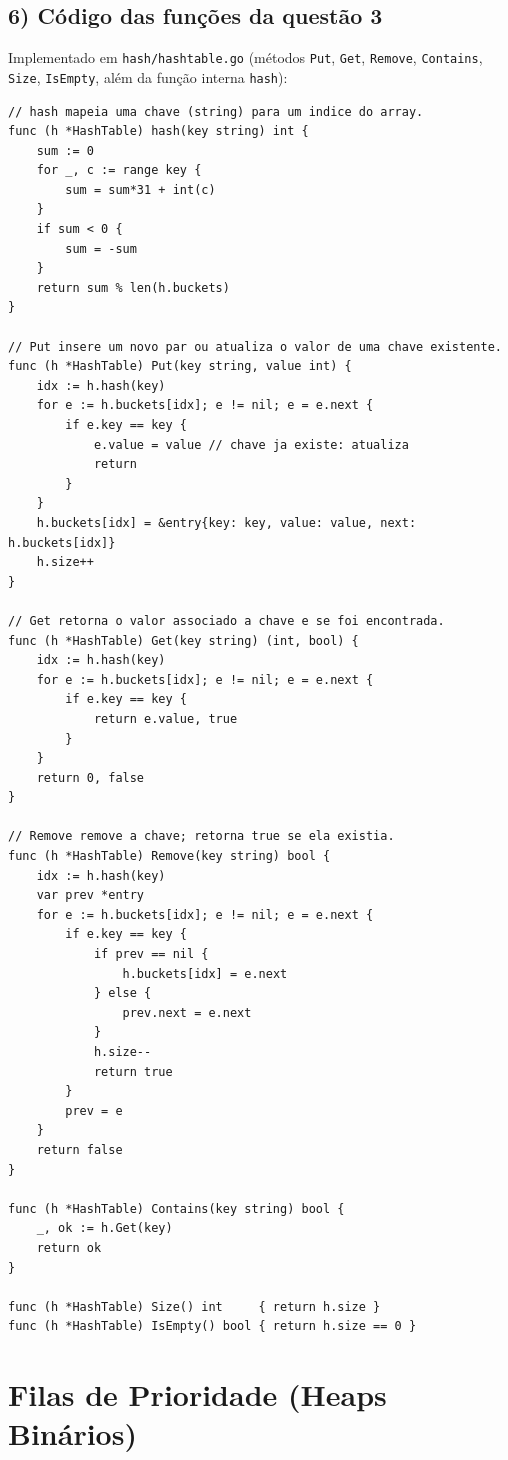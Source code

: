 \documentclass[11pt,a4paper]{article}
\begin{document}
\subsection*{6) Código das funções da questão 3}
Implementado em \texttt{hash/hashtable.go} (métodos \texttt{Put}, \texttt{Get}, \texttt{Remove},
\texttt{Contains}, \texttt{Size}, \texttt{IsEmpty}, além da função interna \texttt{hash}):
\begin{lstlisting}
// hash mapeia uma chave (string) para um indice do array.
func (h *HashTable) hash(key string) int {
    sum := 0
    for _, c := range key {
        sum = sum*31 + int(c)
    }
    if sum < 0 {
        sum = -sum
    }
    return sum % len(h.buckets)
}

// Put insere um novo par ou atualiza o valor de uma chave existente.
func (h *HashTable) Put(key string, value int) {
    idx := h.hash(key)
    for e := h.buckets[idx]; e != nil; e = e.next {
        if e.key == key {
            e.value = value // chave ja existe: atualiza
            return
        }
    }
    h.buckets[idx] = &entry{key: key, value: value, next: h.buckets[idx]}
    h.size++
}

// Get retorna o valor associado a chave e se foi encontrada.
func (h *HashTable) Get(key string) (int, bool) {
    idx := h.hash(key)
    for e := h.buckets[idx]; e != nil; e = e.next {
        if e.key == key {
            return e.value, true
        }
    }
    return 0, false
}

// Remove remove a chave; retorna true se ela existia.
func (h *HashTable) Remove(key string) bool {
    idx := h.hash(key)
    var prev *entry
    for e := h.buckets[idx]; e != nil; e = e.next {
        if e.key == key {
            if prev == nil {
                h.buckets[idx] = e.next
            } else {
                prev.next = e.next
            }
            h.size--
            return true
        }
        prev = e
    }
    return false
}

func (h *HashTable) Contains(key string) bool {
    _, ok := h.Get(key)
    return ok
}

func (h *HashTable) Size() int     { return h.size }
func (h *HashTable) IsEmpty() bool { return h.size == 0 }
\end{lstlisting}

\newpage
\section*{Filas de Prioridade (Heaps Binários)}
\end{document}
